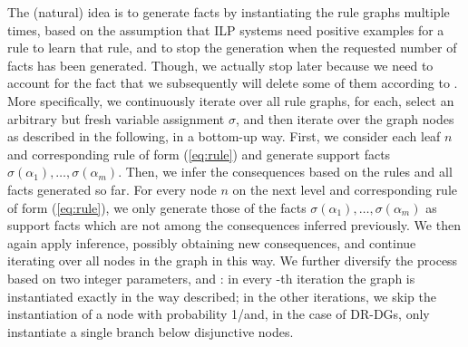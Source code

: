 The (natural) idea is to generate facts by instantiating the rule graphs multiple times,
based on the assumption that ILP systems need positive examples for a rule to learn that rule, and to stop the generation when the requested number of facts has been generated. Though, we actually stop later because we need to account for the fact that we subsequently will delete some of them %
according to \nowa. 
More specifically, we continuously iterate over all rule graphs, for each, select an arbitrary but fresh variable assignment $\sigma$, and then iterate over the graph nodes as described in the following, in a bottom-up way. 
% 
First, we consider each leaf $n$ and corresponding rule of form (\ref{eq:rule}) %
and generate support facts $\sigma(\alpha_1),\dots,\sigma(\alpha_m)$.
Then, we infer the consequences based on the rules and all facts generated so far. %
For every node $n$ on the next level and corresponding rule of form (\ref{eq:rule}), we only generate those of the facts $\sigma(\alpha_1),\dots,\sigma(\alpha_m)$ as support facts which are not among the consequences inferred previously. We then again apply inference, possibly obtaining new consequences, and continue iterating over all nodes in the graph in this way.
We further diversify the process based on two integer parameters, \ndag and \nnskip: in every \ndag-th iteration the graph is instantiated exactly in the way  described; in the other iterations, we skip the instantiation of a node with probability 1/\nnskip and, in the case of DR-DGs, only instantiate a single branch below disjunctive nodes. %

